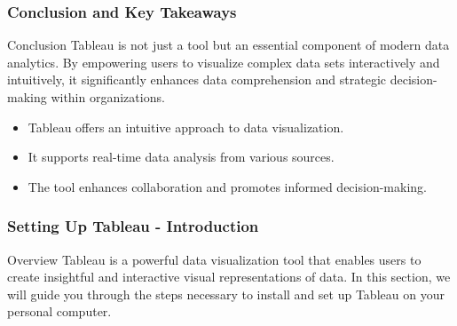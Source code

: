 \documentclass[aspectratio=169]{beamer}
\begin{document}
\begin{frame}[fragile]
    \frametitle{Conclusion and Key Takeaways}
    \begin{block}{Conclusion}
        Tableau is not just a tool but an essential component of modern data analytics. By empowering users to visualize complex data sets interactively and intuitively, it significantly enhances data comprehension and strategic decision-making within organizations.
    \end{block}
    
    \begin{itemize}
        \item Tableau offers an intuitive approach to data visualization.
        \item It supports real-time data analysis from various sources.
        \item The tool enhances collaboration and promotes informed decision-making.
    \end{itemize}
\end{frame}

\begin{frame}[fragile]
    \frametitle{Setting Up Tableau - Introduction}
    \begin{block}{Overview}
        Tableau is a powerful data visualization tool that enables users to create insightful and interactive visual representations of data. In this section, we will guide you through the steps necessary to install and set up Tableau on your personal computer.
    \end{block}
\end{frame}
\end{document}
